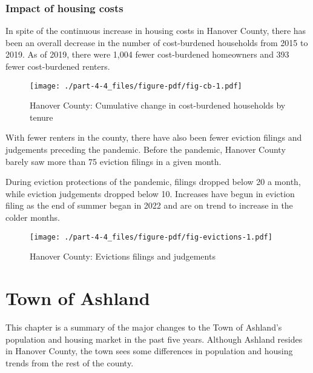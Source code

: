 \documentclass[
  letterpaper,
  DIV=11,
  numbers=noendperiod]{scrreprt}
\begin{document}
\hypertarget{impact-of-housing-costs-3}{%
\subsection{Impact of housing costs}\label{impact-of-housing-costs-3}}

In spite of the continuous increase in housing costs in Hanover County,
there has been an overall decrease in the number of cost-burdened
households from 2015 to 2019. As of 2019, there were 1,004 fewer
cost-burdened homeowners and 393 fewer cost-burdened renters.

\begin{figure}

{\centering \texttt{[image: ./part-4-4\_files/figure-pdf/fig-cb-1.pdf]}

}

\caption{\label{fig-cb}Hanover County: Cumulative change in
cost-burdened households by tenure}

\end{figure}

With fewer renters in the county, there have also been fewer eviction
filings and judgements preceding the pandemic. Before the pandemic,
Hanover County barely saw more than 75 eviction filings in a given
month.

During eviction protections of the pandemic, filings dropped below 20 a
month, while eviction judgements dropped below 10. Increases have begun
in eviction filing as the end of summer began in 2022 and are on trend
to increase in the colder months.

\begin{figure}

{\centering \texttt{[image: ./part-4-4\_files/figure-pdf/fig-evictions-1.pdf]}

}

\caption{\label{fig-evictions}Hanover County: Evictions filings and
judgements}

\end{figure}

\hypertarget{part-4-5}{%
\chapter{Town of Ashland}\label{part-4-5}}

This chapter is a summary of the major changes to the Town of Ashland's
population and housing market in the past five years. Although Ashland
resides in Hanover County, the town sees some differences in population
and housing trends from the rest of the county.
\end{document}
